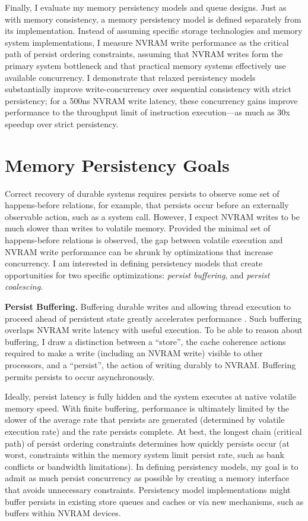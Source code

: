 Finally, I evaluate my memory persistency models and queue designs.
Just as with memory consistency, a memory persistency model is defined separately from its implementation.
Instead of assuming specific storage technologies and memory system implementations, I measure NVRAM write performance as the critical path of persist ordering constraints, assuming that NVRAM writes form the primary system bottleneck and that practical memory systems effectively use available concurrency.
I demonstrate that relaxed persistency models substantially improve write-concurrency over sequential consistency with strict persistency; for a 500ns NVRAM write latency, these concurrency gains improve performance to the throughput limit of instruction execution---as much as 30x speedup over strict persistency.

\section{Memory Persistency Goals}
\label{sec:Persistency:Goals}

Correct recovery of durable systems requires persists to observe some set of happens-before relations, for example, that persists occur before an externally observable action, such as a system call.  
However, I expect NVRAM writes to be much slower than writes to volatile memory.
Provided the minimal set of happens-before relations is observed, the gap between volatile execution and NVRAM write performance can be shrunk by optimizations that increase concurrency. 
I am interested in defining persistency models that create opportunities for two specific optimizations: \emph{persist buffering}, and \emph{persist coalescing}.

\textbf{Persist Buffering.}
Buffering durable writes and allowing thread execution to proceed ahead of persistent state greatly accelerates performance \cite{Condit09}.
Such buffering overlaps NVRAM write latency with useful execution. 
To be able to reason about buffering, I draw a distinction between a ``store'', the cache coherence actions required to make a write (including an NVRAM write) visible to other processors, and a ``persist'', the action of writing durably to NVRAM.
Buffering permits persists to occur asynchronously.  

Ideally, persist latency is fully hidden and the system executes at native volatile memory speed.
With finite buffering, performance is ultimately limited by the slower of the average rate that persists are generated (determined by volatile execution rate) and the rate persists complete.
At best, the longest chain (critical path) of persist ordering constraints determines how quickly persists occur (at worst, constraints within the memory system limit persist rate, such as bank conflicts or bandwidth limitations).
In defining persistency models, my goal is to admit as much persist concurrency as possible by creating a memory interface that avoids unnecessary constraints.
Persistency model implementations might buffer persists in existing store queues and caches or via new mechanisms, such as buffers within NVRAM devices.

